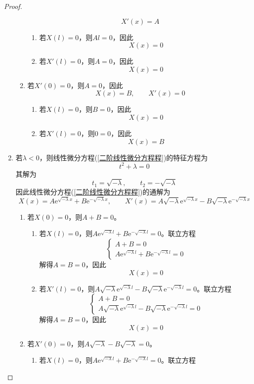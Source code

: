 \documentclass[lang = cn, scheme = chinese, thmcnt = section]{elegantbook}
\newcommand{\ee}[1]{\mathrm{e}^{#1}}   %
\begin{document}
\begin{proof}
\begin{enumerate}
\begin{enumerate}
$$			X'(x)=A
			$$
			\begin{enumerate}
				\item 若$X(l)=0$，则$Al=0$，因此%
				$$
				X(x)=0
				$$
				\item 若$X'(l)=0$，则$A=0$，因此
				$$
				X(x)=0
				$$
			\end{enumerate}
			\item 若$X'(0)=0$，则$A=0$，因此
			$$
			X(x)=B,\qquad
			X'(x)=0
			$$
			\begin{enumerate}
				\item 若$X(l)=0$，则$B=0$，因此%
				$$
				X(x)=0
				$$
				\item 若$X'(l)=0$，则$0=0$，因此
				$$
				X(x)=B
				$$
			\end{enumerate}
		\end{enumerate}
		\item 若$\lambda<0$，则线性微分方程(\ref{二阶线性微分方程程})的特征方程为%
		$$
		t^2+\lambda=0
		$$
		其解为%
		$$
		t_1=\sqrt{-\lambda},\qquad
		t_2=-\sqrt{-\lambda}
		$$
		因此线性微分方程(\ref{二阶线性微分方程程})的通解为%
		$$
		X(x)=A\ee{\sqrt{-\lambda}x}+B\ee{-\sqrt{-\lambda}x},\qquad
		X'(x)=A\sqrt{-\lambda}\ee{\sqrt{-\lambda}x}-B\sqrt{-\lambda}\ee{-\sqrt{-\lambda}x}
		$$
		\begin{enumerate}
			\item 若$X(0)=0$，则$A+B=0$。
			\begin{enumerate}
				\item 若$X(l)=0$，则$A\ee{\sqrt{-\lambda}l}+B\ee{-\sqrt{-\lambda}l}=0$。联立方程%
				$$
				\begin{cases}
					A+B=0\\
					A\ee{\sqrt{-\lambda}l}+B\ee{-\sqrt{-\lambda}l}=0
				\end{cases}
				$$
				解得$A=B=0$，因此
				$$
				X(x)=0
				$$
				\item 若$X'(l)=0$，则$A\sqrt{-\lambda}\ee{\sqrt{-\lambda}l}-B\sqrt{-\lambda}\ee{-\sqrt{-\lambda}l}=0$。联立方程%
				$$
				\begin{cases}
					A+B=0\\
					A\sqrt{-\lambda}\ee{\sqrt{-\lambda}l}-B\sqrt{-\lambda}\ee{-\sqrt{-\lambda}l}=0
				\end{cases}
				$$
				解得$A=B=0$，因此
				$$
				X(x)=0
				$$
			\end{enumerate}
			\item 若$X'(0)=0$，则$A\sqrt{-\lambda}-B\sqrt{-\lambda}=0$。
			\begin{enumerate}
				\item 若$X(l)=0$，则$A\ee{\sqrt{-\lambda}l}+B\ee{-\sqrt{-\lambda}l}=0$。联立方程%

\end{enumerate}
\end{enumerate}
\end{enumerate}
\end{proof}
\end{document}
